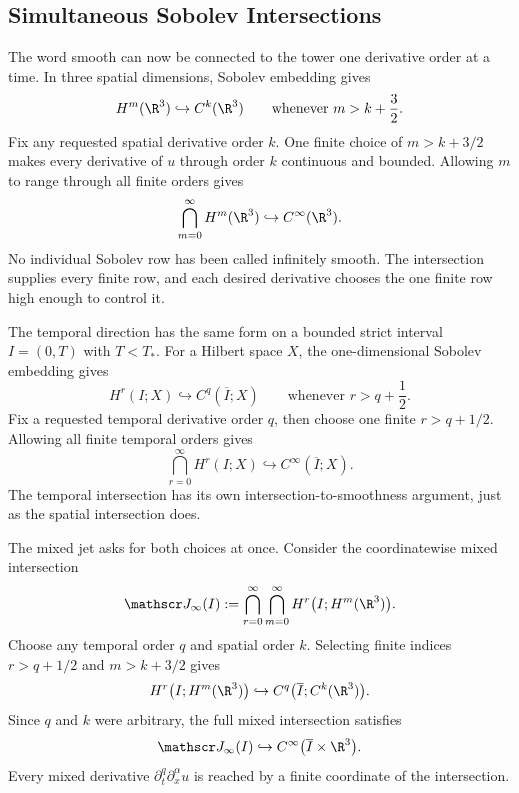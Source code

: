 
\subsection{Simultaneous Sobolev Intersections}\label{sub:SimultaneousSobolevIntersections}

The word smooth can now be connected to the tower one derivative order at a time.
In three spatial dimensions, Sobolev embedding gives
\[
  H^m(\R^3)
  \hookrightarrow
  C^k(\R^3)
  \qquad
  \text{whenever }m>k+\frac32.
\]
Fix any requested spatial derivative order \(k\).
One finite choice of \(m>k+3/2\) makes every derivative of \(u\) through order \(k\) continuous and bounded.
Allowing \(m\) to range through all finite orders gives
\[
  \bigcap_{m=0}^{\infty}H^m(\R^3)
  \hookrightarrow
  C^\infty(\R^3).
\]
No individual Sobolev row has been called infinitely smooth.
The intersection supplies every finite row, and each desired derivative chooses the one finite row high enough to control it.

The temporal direction has the same form on a bounded strict interval \(I=(0,T)\) with \(T<T_*\).
For a Hilbert space \(X\), the one-dimensional Sobolev embedding gives
\[
  H^r(I;X)
  \hookrightarrow
  C^q(\overline I;X)
  \qquad
  \text{whenever }r>q+\frac12.
\]
Fix a requested temporal derivative order \(q\), then choose one finite \(r>q+1/2\).
Allowing all finite temporal orders gives
\[
  \bigcap_{r=0}^{\infty}H^r(I;X)
  \hookrightarrow
  C^\infty(\overline I;X).
\]
The temporal intersection has its own intersection-to-smoothness argument, just as the spatial intersection does.

The mixed jet asks for both choices at once.
Consider the coordinatewise mixed intersection
\[
  \mathscr J_\infty(I)
  :=
  \bigcap_{r=0}^{\infty}
  \bigcap_{m=0}^{\infty}
  H^r\bigl(I;H^m(\R^3)\bigr).
\]
Choose any temporal order \(q\) and spatial order \(k\).
Selecting finite indices \(r>q+1/2\) and \(m>k+3/2\) gives
\[
  H^r\bigl(I;H^m(\R^3)\bigr)
  \hookrightarrow
  C^q\bigl(\overline I;C^k(\R^3)\bigr).
\]
Since \(q\) and \(k\) were arbitrary, the full mixed intersection satisfies
\[
  \mathscr J_\infty(I)
  \hookrightarrow
  C^\infty\bigl(\overline I\times\R^3\bigr).
\]
Every mixed derivative \(\partial_t^q\partial_x^\alpha u\) is reached by a finite coordinate of the intersection.

